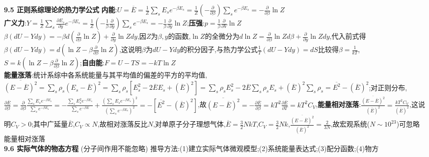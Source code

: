\documentclass[10pt,a4paper]{article}
\begin{document}
\begin{multicols}{2}
\textbf{9.5 正则系综理论的热力学公式}
\textbf{内能}:$U=\overline{E}=\frac{1}{Z}\sum_sE_se^{-\beta E_s}=\frac{1}{Z}\left(-\frac{\partial}{\partial\beta}\right)\sum_se^{-\beta E_s}=-\frac{\partial}{\partial\beta}\ln Z$\\
\textbf{广义力}:$Y=\frac{1}{Z}\sum_s\frac{\partial E_s}{\partial y}e^{-\beta E_s}=\frac{1}{Z}\left(-\frac{1}{\beta}\frac{\partial}{\partial y}\right)\sum_se^{-\beta E_s}=-\frac{1}{\beta}\frac{\partial}{\partial y}\ln Z$;\textbf{压强}:$p=\frac{1}{\beta}\frac{\partial}{\partial V}\ln Z$\\
$\beta(dU-Ydy)=-\beta d\left(\frac{\partial}{\partial\beta}\ln Z\right)+\frac{\partial}{\partial y}\ln Zdy$,因$Z$为$\beta,y$的函数,$\ln Z$的全微分为$d\ln Z=\frac{\partial}{\partial\beta}\ln Zd\beta+\frac{\partial}{\partial y}\ln Zdy$,代入前式得$\beta(dU-Ydy)=d\left(\ln Z-\beta\frac{\partial}{\partial\beta}\ln Z\right)$,这说明$\beta$为$dU-Ydy$的积分因子,与热力学公式$\frac{1}{T}(dU-Ydy)=dS$比较得$\beta=\frac{1}{kT}$,$S=k\left(\ln Z-\beta\frac{\partial}{\partial\beta}\ln Z\right)$;\textbf{自由能}:$F=U-TS=-kT\ln Z$\\
\textbf{能量涨落}:统计系综中各系统能量与其平均值的偏差的平方的平均值,$\overline{(E-\overline{E})^2}=\sum_s\rho_s(E_s-\overline{E})^2=\sum_s\rho_s\left[E_s^2-2\overline{E}E_s+(\overline{E})^2\right]=\sum_s\rho_sE_s^2-2\overline{E}\sum_s\rho_sE_s+(\overline{E})^2\sum_s\rho_s=\overline{E^2}-(\overline{E})^2$;对正则分布,$\frac{\partial\overline{E}}{\partial\beta}=\frac{\partial}{\partial\beta}\frac{\sum_sE_se^{-\beta E_s}}{\sum_se^{-\beta E_s}}=-\frac{\sum_sE_s^2e^{-\beta E_s}}{\sum_se^{-\beta E}}+\frac{\left(\sum_sE_se^{-\beta E_s}\right)^2}{\left(\sum_se^{-\beta E_s}\right)^2}=-\left[\overline{E^2}-(\overline{E})^2\right]$,故$\overline{(E-\overline{E})^2}=-\frac{\partial\overline{E}}{\partial\beta}=kT^2\frac{\partial\overline{E}}{\partial T}=kT^2C_V$,\textbf{能量相对涨落}:$\frac{\overline{(E-\overline{E})^2}}{(\overline{E})^2}=\frac{kT^2C_V}{(\overline{E})^2}$,这说明$C_V>0$;其中广延量$\overline{E}$,$C_V\propto N$,故相对涨落反比$N$,对单原子分子理想气体,$\overline{E}=\frac{3}{2}NkT$,$C_V=\frac{3}{2}Nk$,$\frac{\overline{(E-\overline{E})^2}}{(\overline{E})^2}=\frac{2}{3N}$,故宏观系统($N\sim10^{23}$)可忽略能量相对涨落\\
\textbf{9.6 实际气体的物态方程}
(分子间作用不能忽略)
推导方法:(1)建立实际气体微观模型;(2)系统能量表达式;(3)配分函数;(4)物方\\

\end{multicols}
\end{document}
